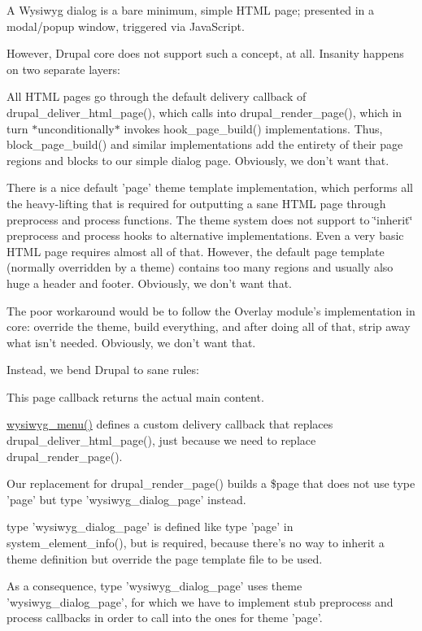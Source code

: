 A Wysiwyg dialog is a bare minimum, simple HTML page; presented in a modal/popup window, triggered via JavaScript.

However, Drupal core does not support such a concept, at all. Insanity happens on two separate layers:
\begin{DoxyItemize}
\item All HTML pages go through the default delivery callback of drupal\_\-deliver\_\-html\_\-page(), which calls into drupal\_\-render\_\-page(), which in turn $\ast$unconditionally$\ast$ invokes hook\_\-page\_\-build() implementations. Thus, block\_\-page\_\-build() and similar implementations add the entirety of their page regions and blocks to our simple dialog page. Obviously, we don't want that.
\item There is a nice default 'page' theme template implementation, which performs all the heavy-\/lifting that is required for outputting a sane HTML page through preprocess and process functions. The theme system does not support to \char`\"{}inherit\char`\"{} preprocess and process hooks to alternative implementations. Even a very basic HTML page requires almost all of that. However, the default page template (normally overridden by a theme) contains too many regions and usually also huge a header and footer. Obviously, we don't want that.
\end{DoxyItemize}

The poor workaround would be to follow the Overlay module's implementation in core: override the theme, build everything, and after doing all of that, strip away what isn't needed. Obviously, we don't want that.

Instead, we bend Drupal to sane rules:
\begin{DoxyItemize}
\item This page callback returns the actual main content.
\item \hyperlink{wysiwyg_8module_a7bbcb615ff86965ede6de1ebdaf1f360}{wysiwyg\_\-menu()} defines a custom delivery callback that replaces drupal\_\-deliver\_\-html\_\-page(), just because we need to replace drupal\_\-render\_\-page().
\item Our replacement for drupal\_\-render\_\-page() builds a \$page that does not use type 'page' but type 'wysiwyg\_\-dialog\_\-page' instead.
\item type 'wysiwyg\_\-dialog\_\-page' is defined like type 'page' in system\_\-element\_\-info(), but is required, because there's no way to inherit a theme definition but override the page template file to be used.
\item As a consequence, type 'wysiwyg\_\-dialog\_\-page' uses theme 'wysiwyg\_\-dialog\_\-page', for which we have to implement stub preprocess and process callbacks in order to call into the ones for theme 'page'.
\end{DoxyItemize}

